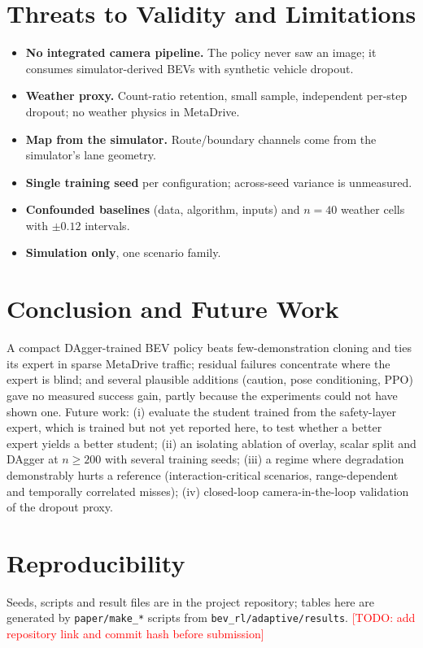 \documentclass[conference]{IEEEtran}
\newcommand{\todo}[1]{\textcolor{red}{[TODO: #1]}}
\begin{document}
\section{Threats to Validity and Limitations}
\begin{itemize}
\item \textbf{No integrated camera pipeline.} The policy never saw an image; it consumes simulator-derived BEVs with synthetic vehicle dropout.
\item \textbf{Weather proxy.} Count-ratio retention, small sample, independent per-step dropout; no weather physics in MetaDrive.
\item \textbf{Map from the simulator.} Route/boundary channels come from the simulator's lane geometry.
\item \textbf{Single training seed} per configuration; across-seed variance is unmeasured.
\item \textbf{Confounded baselines} (data, algorithm, inputs) and $n{=}40$ weather cells with $\pm0.12$ intervals.
\item \textbf{Simulation only}, one scenario family.
\end{itemize}

\section{Conclusion and Future Work}
A compact DAgger-trained BEV policy beats few-demonstration cloning and ties its expert in sparse MetaDrive traffic; residual failures concentrate where the expert is blind; and several plausible additions (caution, pose conditioning, PPO) gave no measured success gain, partly because the experiments could not have shown one. Future work: (i) evaluate the student trained from the safety-layer expert, which is trained but not yet reported here, to test whether a better expert yields a better student; (ii) an isolating ablation of overlay, scalar split and DAgger at $n\ge200$ with several training seeds; (iii) a regime where degradation demonstrably hurts a reference (interaction-critical scenarios, range-dependent and temporally correlated misses); (iv) closed-loop camera-in-the-loop validation of the dropout proxy.

\section*{Reproducibility}
Seeds, scripts and result files are in the project repository; tables here are generated by \texttt{paper/make\_*} scripts from \texttt{bev\_rl/adaptive/results}. \todo{add repository link and commit hash before submission}
\end{document}
